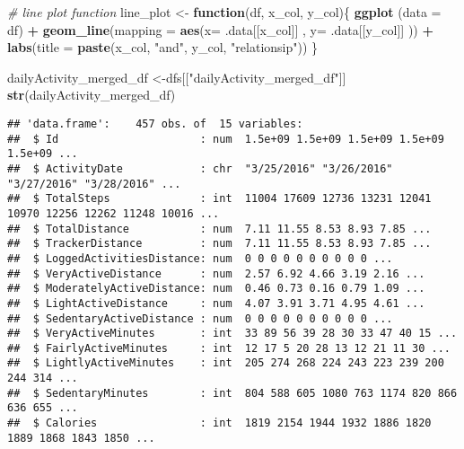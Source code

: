 \documentclass[
]{article}
\newenvironment{Shaded}{\begin{snugshade}}{\end{snugshade}}
\newcommand{\AttributeTok}[1]{\textcolor[rgb]{0.13,0.29,0.53}{#1}}
\newcommand{\CommentTok}[1]{\textcolor[rgb]{0.56,0.35,0.01}{\textit{#1}}}
\newcommand{\ControlFlowTok}[1]{\textcolor[rgb]{0.13,0.29,0.53}{\textbf{#1}}}
\newcommand{\FunctionTok}[1]{\textcolor[rgb]{0.13,0.29,0.53}{\textbf{#1}}}
\newcommand{\NormalTok}[1]{#1}
\newcommand{\OtherTok}[1]{\textcolor[rgb]{0.56,0.35,0.01}{#1}}
\newcommand{\SpecialCharTok}[1]{\textcolor[rgb]{0.81,0.36,0.00}{\textbf{#1}}}
\newcommand{\StringTok}[1]{\textcolor[rgb]{0.31,0.60,0.02}{#1}}
\begin{document}
\begin{Shaded}
\begin{Highlighting}[]
\CommentTok{\# line plot function }
\NormalTok{line\_plot }\OtherTok{\textless{}{-}} \ControlFlowTok{function}\NormalTok{(df, x\_col, y\_col)\{}
  \FunctionTok{ggplot}\NormalTok{ (}\AttributeTok{data =}\NormalTok{ df) }\SpecialCharTok{+}
    \FunctionTok{geom\_line}\NormalTok{(}\AttributeTok{mapping =} \FunctionTok{aes}\NormalTok{(}\AttributeTok{x=}\NormalTok{ .data[[x\_col]] , }\AttributeTok{y=}\NormalTok{ .data[[y\_col]] )) }\SpecialCharTok{+}
    \FunctionTok{labs}\NormalTok{(}\AttributeTok{title =} \FunctionTok{paste}\NormalTok{(x\_col, }\StringTok{"and"}\NormalTok{, y\_col, }\StringTok{"relationsip"}\NormalTok{))}
\NormalTok{\}}
\end{Highlighting}
\end{Shaded}

\begin{Shaded}
\begin{Highlighting}[]
\NormalTok{dailyActivity\_merged\_df }\OtherTok{\textless{}{-}}\NormalTok{dfs[[}\StringTok{"dailyActivity\_merged\_df"}\NormalTok{]]}
\FunctionTok{str}\NormalTok{(dailyActivity\_merged\_df)}
\end{Highlighting}
\end{Shaded}

\begin{verbatim}
## 'data.frame':    457 obs. of  15 variables:
##  $ Id                      : num  1.5e+09 1.5e+09 1.5e+09 1.5e+09 1.5e+09 ...
##  $ ActivityDate            : chr  "3/25/2016" "3/26/2016" "3/27/2016" "3/28/2016" ...
##  $ TotalSteps              : int  11004 17609 12736 13231 12041 10970 12256 12262 11248 10016 ...
##  $ TotalDistance           : num  7.11 11.55 8.53 8.93 7.85 ...
##  $ TrackerDistance         : num  7.11 11.55 8.53 8.93 7.85 ...
##  $ LoggedActivitiesDistance: num  0 0 0 0 0 0 0 0 0 0 ...
##  $ VeryActiveDistance      : num  2.57 6.92 4.66 3.19 2.16 ...
##  $ ModeratelyActiveDistance: num  0.46 0.73 0.16 0.79 1.09 ...
##  $ LightActiveDistance     : num  4.07 3.91 3.71 4.95 4.61 ...
##  $ SedentaryActiveDistance : num  0 0 0 0 0 0 0 0 0 0 ...
##  $ VeryActiveMinutes       : int  33 89 56 39 28 30 33 47 40 15 ...
##  $ FairlyActiveMinutes     : int  12 17 5 20 28 13 12 21 11 30 ...
##  $ LightlyActiveMinutes    : int  205 274 268 224 243 223 239 200 244 314 ...
##  $ SedentaryMinutes        : int  804 588 605 1080 763 1174 820 866 636 655 ...
##  $ Calories                : int  1819 2154 1944 1932 1886 1820 1889 1868 1843 1850 ...
\end{verbatim}
\end{document}

